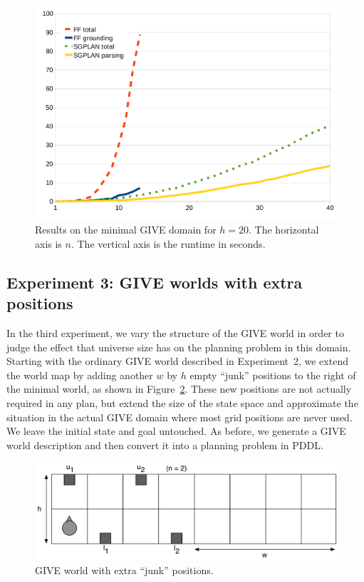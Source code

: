 \begin{figure}[t]
  \centering
  \includegraphics[width=0.75\columnwidth]{graph-exp2}
  \caption{Results on the minimal GIVE
    domain for $h=20$. The horizontal axis is $n$. The vertical axis
    is the runtime in seconds.}
  \label{fig:give-runtime-minimal}
\end{figure}


\subsection{Experiment 3: GIVE worlds with extra positions}
\label{sec:experiment-3:-give}

In the third experiment, we vary the structure of the GIVE world in order
to judge the effect that universe size has on the planning problem in this
domain. Starting with the ordinary GIVE world described in Experiment~2, we
extend the world map by adding another $w$ by $h$ empty ``junk'' positions
to the right of the minimal world, as shown in Figure~\ref{fig:give-junk}.
These new positions are not actually required in any plan, but extend the
size of the state space and approximate the situation in the actual GIVE
domain where most grid positions are never used. We leave the initial state
and goal untouched. As before, we generate a GIVE world description and
then convert it into a planning problem in PDDL.

\begin{figure}[t]
  \centering
  \includegraphics[width=0.80\columnwidth]{pic-empty-buttons}
  \caption{GIVE world with extra ``junk'' positions.}
  \label{fig:give-junk}
\end{figure}

